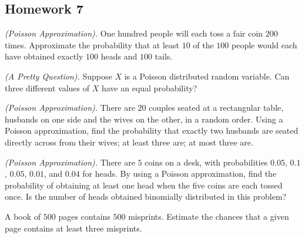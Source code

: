 \subsection{Homework 7}
\begin{problem}[Handout 10, \# 4]
  \emph{(Poisson Approximation).} One hundred people will each toss a fair
  coin \(200\) times. Approximate the probability that at least \(10\) of
  the \(100\) people would each have obtained exactly \(100\) heads and
  \(100\) tails.
\end{problem}
\begin{solution*}
\end{solution*}

\begin{problem}[Handout 10, \# 5]
  \emph{(A Pretty Question).} Suppose \(X\) is a Poisson distributed random
  variable. Can three different values of \(X\) have an equal probability?
\end{problem}
\begin{solution*}

\end{solution*}

\begin{problem}[Handout 10, \# 6]
  \emph{(Poisson Approximation).} There are \(20\) couples seated at a
  rectangular table, husbands on one side and the wives on the other, in a
  random order. Using a Poisson approximation, find the probability that
  exactly two husbands are seated directly across from their wives; at
  least three are; at most three are.
\end{problem}
\begin{solution*}

\end{solution*}

\begin{problem}[Handout 10, \# 7]
  \emph{(Poisson Approximation).} There are \(5\) coins on a desk, with
  probabilities \(0.05\), \(0.1\), \(0.05\), \(0.01\), and \(0.04\) for
  heads. By using a Poisson approximation, find the probability of
  obtaining at least one head when the five coins are each tossed once. Is
  the number of heads obtained binomially distributed in this problem?
\end{problem}
\begin{solution*}

\end{solution*}

\begin{problem}[Handout 10, \# 8]
  A book of \(500\) pages contains \(500\) misprints. Estimate the chances
  that a given page contains at least three misprints.
\end{problem}
\begin{solution*}

\end{solution*}


